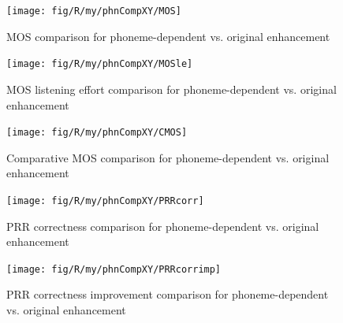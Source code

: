 \begin{figure}[h]
\noindent \begin{centering}
\texttt{[image: fig/R/my/phnCompXY/MOS]}
\par\end{centering}

\protect\caption{\label{fig:mos-comparison-phn}\acs{MOS} comparison for phoneme-dependent
vs. original enhancement}
\end{figure}


\begin{figure}[h]
\noindent \begin{centering}
\texttt{[image: fig/R/my/phnCompXY/MOSle]}
\par\end{centering}

\protect\caption{\label{fig:mosle-comparison-phn}\acs{MOS} listening effort comparison
for phoneme-dependent vs. original enhancement}
\end{figure}


\begin{figure}[h]
\noindent \begin{centering}
\texttt{[image: fig/R/my/phnCompXY/CMOS]}
\par\end{centering}

\protect\caption{\label{fig:cmos-comparison-phn}Comparative \acs{MOS} comparison
for phoneme-dependent vs. original enhancement}
\end{figure}


\begin{figure}[h]
\noindent \begin{centering}
\texttt{[image: fig/R/my/phnCompXY/PRRcorr]}
\par\end{centering}

\protect\caption{\label{fig:prrcorr-comparison-phn}\acs{PRR} correctness comparison
for phoneme-dependent vs. original enhancement}
\end{figure}


\begin{figure}[h]
\noindent \begin{centering}
\texttt{[image: fig/R/my/phnCompXY/PRRcorrimp]}
\par\end{centering}

\protect\caption{\label{fig:prrcorrimp-comparison-phn}\acs{PRR} correctness improvement
comparison for phoneme-dependent vs. original enhancement}
\end{figure}


